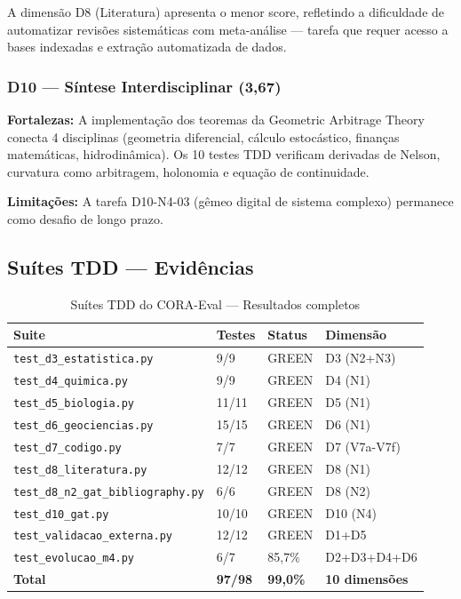 \documentclass[12pt,a4paper,oneside]{article}
\begin{document}
A dimensão D8 (Literatura) apresenta o menor score, refletindo a dificuldade
de automatizar revisões sistemáticas com meta-análise — tarefa que requer
acesso a bases indexadas e extração automatizada de dados.

\subsubsection{D10 — Síntese Interdisciplinar (3,67)}

\textbf{Fortalezas:} A implementação dos teoremas da Geometric Arbitrage Theory
conecta 4 disciplinas (geometria diferencial, cálculo estocástico, finanças
matemáticas, hidrodinâmica). Os 10 testes TDD verificam derivadas de Nelson,
curvatura como arbitragem, holonomia e equação de continuidade.

\textbf{Limitações:} A tarefa D10-N4-03 (gêmeo digital de sistema complexo)
permanece como desafio de longo prazo.

\subsection{Suítes TDD — Evidências}

\begin{table}[H]
\centering
\caption{Suítes TDD do CORA-Eval — Resultados completos}
\label{tab:tdd}
\begin{tabular}{p{}p{}p{}p{}}
\toprule
\textbf{Suite} & \textbf{Testes} & \textbf{Status} & \textbf{Dimensão} \\
\midrule
\texttt{test\_d3\_estatistica.py} & 9/9 & GREEN & D3 (N2+N3) \\
\texttt{test\_d4\_quimica.py} & 9/9 & GREEN & D4 (N1) \\
\texttt{test\_d5\_biologia.py} & 11/11 & GREEN & D5 (N1) \\
\texttt{test\_d6\_geociencias.py} & 15/15 & GREEN & D6 (N1) \\
\texttt{test\_d7\_codigo.py} & 7/7 & GREEN & D7 (V7a-V7f) \\
\texttt{test\_d8\_literatura.py} & 12/12 & GREEN & D8 (N1) \\
\texttt{test\_d8\_n2\_gat\_bibliography.py} & 6/6 & GREEN & D8 (N2) \\
\texttt{test\_d10\_gat.py} & 10/10 & GREEN & D10 (N4) \\
\texttt{test\_validacao\_externa.py} & 12/12 & GREEN & D1+D5 \\
\texttt{test\_evolucao\_m4.py} & 6/7 & 85,7\% & D2+D3+D4+D6 \\
\midrule
\textbf{Total} & \textbf{97/98} & \textbf{99,0\%} & \textbf{10 dimensões} \\
\bottomrule
\end{tabular}
\end{table}
\end{document}
